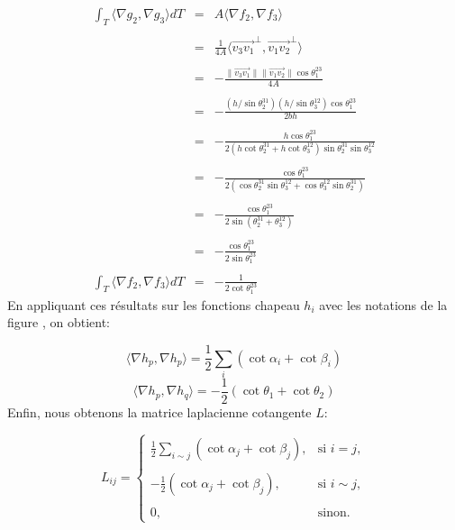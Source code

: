 \[
\begin{array}{lcl}
\displaystyle\int_T \langle \nabla g_2, \nabla g_3 \rangle dT &= &A\langle \nabla f_2, \nabla f_3 \rangle\\\\
&=& \displaystyle\frac{1}{4A} \langle \overrightarrow{v_3v_1}^\perp, \overrightarrow{v_1v_2}^\perp \rangle\\\\
&=& -\displaystyle\frac{\|\overrightarrow{v_3v_1}\|\|\overrightarrow{v_1v_2}\| \cos \theta_1^{23}}{4A}\\\\
&=& -\displaystyle\frac{(h/\sin \theta_2^{31})(h/\sin \theta_3^{12}) \cos \theta_1^{23}}{2bh}\\\\
&=& -\displaystyle\frac{h \cos \theta_1^{23}}{2(h \cot \theta_2^{31} + h \cot \theta_3^{12}) \sin \theta_2^{31} \sin \theta_3^{12}}\\\\
&=& -\displaystyle\frac{\cos \theta_1^{23}}{2(\cos \theta_2^{31} \sin \theta_3^{12} + \cos \theta_3^{12} \sin \theta_2^{31})}\\\\
&=& -\displaystyle\frac{\cos \theta_1^{23}}{2 \sin(\theta_2^{31} + \theta_3^{12})}\\\\
&=& -\displaystyle\frac{\cos \theta_1^{23}}{2 \sin \theta_1^{23}}\\\\
\displaystyle\int_T \langle \nabla f_2, \nabla f_3 \rangle dT&=& -\displaystyle\frac{1}{2 \cot \theta_1^{23}}
\end{array}
\]
En appliquant ces résultats sur les fonctions chapeau \(h_i\) avec les notations de la figure  , on obtient:

\[
\langle \nabla h_p, \nabla h_p \rangle = \frac{1}{2} \sum_i (\cot \alpha_i + \cot \beta_i)
\]
\[
\langle \nabla h_p, \nabla h_q \rangle = -\frac{1}{2} (\cot \theta_1 + \cot \theta_2)
\]
Enfin, nous obtenons la matrice laplacienne cotangente \(L\):

\[
L_{ij} =
\begin{cases}
\displaystyle\frac{1}{2} \sum_{i\sim j} (\cot \alpha_j + \cot \beta_j), & \text{si } i = j, \\\\
-\displaystyle\frac{1}{2} (\cot \alpha_j + \cot \beta_j), & \text{si } i \sim j, \\\\
0, & \text{sinon}.
\end{cases}
\]

